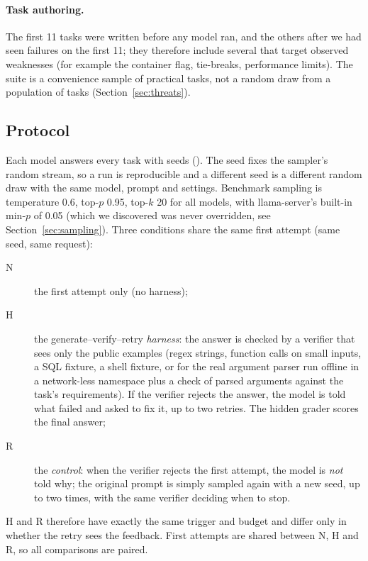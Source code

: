 \paragraph{Task authoring.} The first 11 tasks were written before any model ran, and the \nnew{} others after we had seen failures on the first 11; they therefore include several that target observed weaknesses
(for example the  container flag, tie-breaks, performance limits). The suite is a convenience sample of practical tasks, not a random draw from a population of tasks (Section~\ref{sec:threats}).

\subsection{Protocol}
\label{sec:protocol}
Each model answers every task with \nseeds{} seeds (\seedlist{}). The seed fixes the sampler's random stream, so a run is reproducible and a different seed is a different random draw with the same model, prompt and
settings. Benchmark sampling is temperature 0.6, top-$p$ 0.95, top-$k$ 20 for all models, with llama-server's built-in $\mathrm{min}\text{-}p$ of 0.05 (which we discovered was never overridden, see Section~\ref{sec:sampling}).
Three conditions share the same first attempt (same seed, same request):
\begin{description}
\item[N] the first attempt only (no harness);
\item[H] the generate--verify--retry \emph{harness}: the answer is checked by a verifier that sees only the public examples (regex strings, function calls on small inputs, a SQL fixture, a shell fixture, or for 
the real  argument parser run offline in a network-less namespace plus a check of parsed arguments against the task's requirements). If the verifier rejects the answer, the model is told what failed and asked to fix it, up to two retries. The hidden grader scores the final answer;
\item[R] the \emph{control}: when the verifier rejects the first attempt, the model is \emph{not} told why; the original prompt is simply sampled again with a new seed, up to two times, with the same verifier deciding when to stop.
\end{description}
H and R therefore have exactly the same trigger and budget and differ only in whether the retry sees the feedback. First attempts are shared between N, H and R, so all comparisons are paired.

